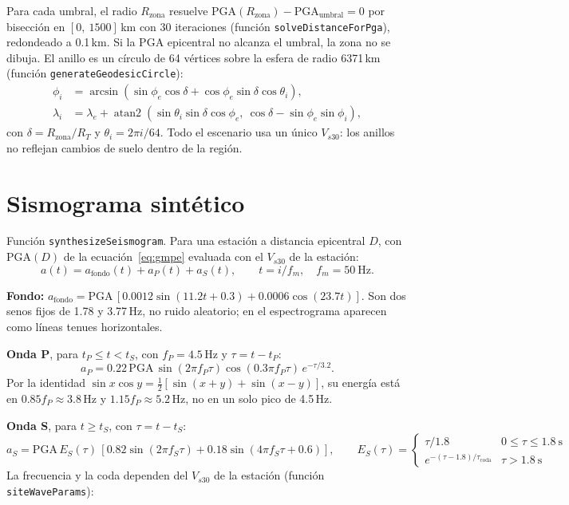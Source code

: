 \documentclass[11pt,a4paper]{article}
\begin{document}
Para cada umbral, el radio $R_{\mathrm{zona}}$ resuelve $\mathrm{PGA}(R_{\mathrm{zona}}) - \mathrm{PGA}_{\mathrm{umbral}} = 0$
por bisección en $[0,\ 1500]$\,km con 30 iteraciones (función \texttt{solveDistanceForPga}), redondeado
a 0.1\,km. Si la PGA epicentral no alcanza el umbral, la zona no se dibuja. El anillo es un círculo de
64 vértices sobre la esfera de radio 6371\,km (función \texttt{generateGeodesicCircle}):
\begin{align}
  \phi_i &= \arcsin(\sin\phi_e\cos\delta + \cos\phi_e\sin\delta\cos\theta_i),\\
  \lambda_i &= \lambda_e + \operatorname{atan2}(\sin\theta_i\sin\delta\cos\phi_e,\ \cos\delta - \sin\phi_e\sin\phi_i),
\end{align}
con $\delta = R_{\mathrm{zona}}/R_T$ y $\theta_i = 2\pi i/64$. Todo el escenario usa un único
$V_{s30}$: los anillos no reflejan cambios de suelo dentro de la región.

\section{Sismograma sintético}

Función \texttt{synthesizeSeismogram}. Para una estación a distancia epicentral $D$, con PGA$(D)$ de
la ecuación~\eqref{eq:gmpe} evaluada con el $V_{s30}$ de la estación:
\begin{equation}
  a(t) = a_{\mathrm{fondo}}(t) + a_P(t) + a_S(t), \qquad t = i/f_m,\quad f_m = 50\ \text{Hz}.
\end{equation}

\textbf{Fondo:} $a_{\mathrm{fondo}} = \mathrm{PGA}\,[0.0012\sin(11.2t + 0.3) + 0.0006\cos(23.7t)]$.
Son dos senos fijos de 1.78 y 3.77\,Hz, no ruido aleatorio; en el espectrograma aparecen como líneas
tenues horizontales.

\textbf{Onda P}, para $t_P \le t < t_S$, con $f_P = 4.5$\,Hz y $\tau = t - t_P$:
\begin{equation}
  a_P = 0.22\,\mathrm{PGA}\,\sin(2\pi f_P \tau)\cos(0.3\pi f_P \tau)\,e^{-\tau/3.2}.
\end{equation}
Por la identidad $\sin x\cos y = \tfrac12[\sin(x+y) + \sin(x-y)]$, su energía está en
$0.85 f_P \approx 3.8$\,Hz y $1.15 f_P \approx 5.2$\,Hz, no en un solo pico de 4.5\,Hz.

\textbf{Onda S}, para $t \ge t_S$, con $\tau = t - t_S$:
\begin{equation}
  a_S = \mathrm{PGA}\,E_S(\tau)\,[0.82\sin(2\pi f_S\tau) + 0.18\sin(4\pi f_S \tau + 0.6)],
  \qquad
  E_S(\tau) =
  \begin{cases}
    \tau/1.8 & 0 \le \tau \le 1.8\ \text{s}\\
    e^{-(\tau - 1.8)/\tau_{\mathrm{coda}}} & \tau > 1.8\ \text{s}
  \end{cases}
\end{equation}
La frecuencia y la coda dependen del $V_{s30}$ de la estación (función \texttt{siteWaveParams}):
\end{document}
